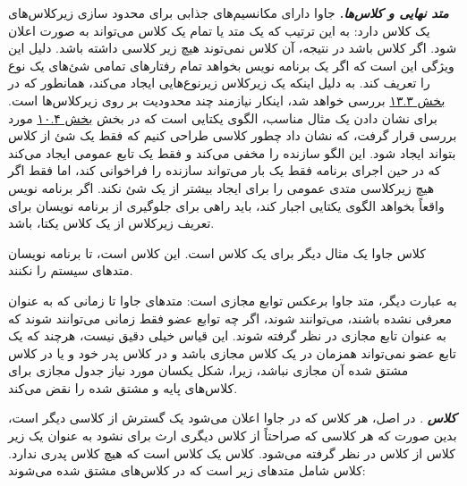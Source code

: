 \documentclass[a4paper,12pt]{report}
\newcommand{\lrm}[1]{{\color{steelBlue}\lr{\texttt{#1}}}}
\begin{document}
	
	\textit{\textbf{
			متد نهایی
			 و کلاس‌ها.}}   جاوا دارای مکانسیم‌های جذابی برای محدود سازی زیرکلاس‌های یک کلاس دارد: به این ترتیب که یک متد یا تمام یک کلاس می‌تواند به صورت 
	  اعلان شود. اگر کلاس 
	   باشد در نتیجه، آن کلاس نمی‌توند هیچ زیر کلاسی داشته باشد. دلیل این ویژگی این است که اگر یک برنامه نویس بخواهد تمام رفتارهای تمامی شئ‌های یک نوع را تعریف کند. به دلیل اینکه یک زیرکلاس زیرنوع‌هایی ایجاد می‌کند، همانطور که در 
	\hyperref[sec3:chap13]{
	بخش ۱۳.۳} بررسی خواهد شد، اینکار نیازمند چند محدودیت بر روی زیرکلاس‌ها است. برای نشان دادن یک مثال مناسب، الگوی یکتایی
	است که در بخش 
	\hyperref[sec4:chap10]{
	بخش ۱۰.۴} مورد بررسی قرار گرفت، که نشان داد چطور کلاسی طراحی کنیم که فقط یک شئ
	از کلاس بتواند ایجاد شود. این الگو سازنده را مخفی می‌کند و فقط یک تابع عمومی ایجاد می‌کند که در حین اجرای برنامه فقط یک بار می‌تواند سازنده را فراخوانی کند، اما فقط اگر هیچ زیرکلاسی متدی عمومی را برای ایجاد بیشتر از یک شئ 
	 نکند.
	اگر برنامه نویس واقعاً بخواهد الگوی یکتایی اجبار کند، باید راهی برای جلوگیری از برنامه نویسان برای تعریف زیرکلاس از یک کلاس یکتا، باشد. 
	
	 کلاس جاوا 
	\lrm{java.lang.System}
	یک مثال دیگر برای یک کلاس
	 است. این کلاس 
	 است، تا برنامه نویسان متد‌های سیستم را 
	نکنند.
	
	به عبارت دیگر،‌ متد 
	جاوا برعکس توابع مجازی 
	است: متد‌های جاوا تا زمانی که به عنوان 
	معرفی نشده باشند، می‌توانند 
	 شوند، اگر چه توابع عضو 
	 فقط زمانی می‌توانند 
	  شوند که به عنوان تابع مجازی در نظر گرفته شوند.
	 این قیاس خیلی دقیق نیست، هرچند که یک تابع عضو 
	 نمی‌تواند همزمان در یک کلاس مجازی باشد و در کلاس پدر خود و یا در کلاس مشتق شده آن مجازی نباشد، زیرا،   شکل یکسان مورد نیاز جدول مجازی برای کلاس‌های پایه و مشتق شده را نقض می‌کند. 
	
	
	\textit{\textbf{
	کلاس 
	}}.
	در اصل، هر کلاس که در جاوا اعلان می‌شود یک گسترش
	از کلاسی دیگر است، بدین صورت که هر کلاسی که صراحتاً از کلاس دیگری ارث برای نشود به عنوان یک زیر کلاس از کلاس 
	در نظر گرفته می‌شود.
	کلاس 
	\lrm{Object}
	یک کلاس است که هیچ کلاس پدری ندارد. کلاس 
	\lrm{Object}
	شامل متدهای زیر است که در کلاس‌های مشتق شده 
	\lrm{override}
	می‌شوند:
	
\end{document}

